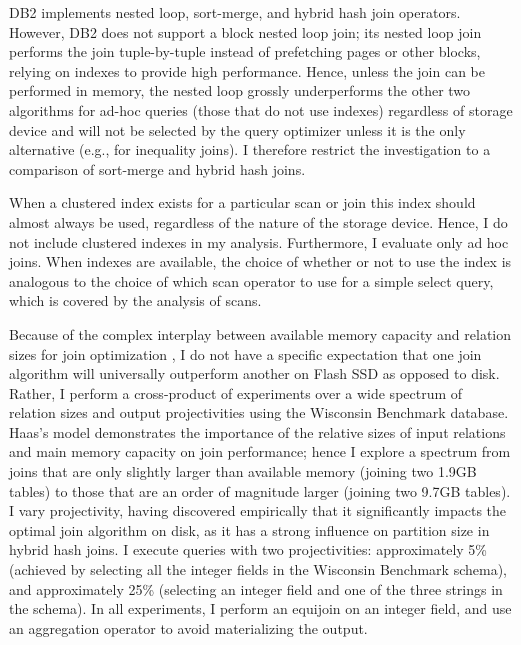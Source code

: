 DB2 implements nested loop, sort-merge, and hybrid hash join operators.  
However, DB2 does not support a block nested loop join; its nested loop join performs the join tuple-by-tuple instead of prefetching pages or other blocks, relying on indexes to provide high performance.
Hence, unless the join can be performed in memory, the nested loop grossly underperforms the other two algorithms for ad-hoc queries (those that do not use indexes) regardless of storage device and will not be selected by the query optimizer unless it is the only alternative (e.g., for inequality joins). 
I therefore restrict the investigation to a comparison of sort-merge and hybrid hash joins.

When a clustered index exists for a particular scan or join this index should almost always be used, regardless of the nature of the storage device.  
Hence, I do not include clustered indexes in my analysis.
Furthermore, I evaluate only ad hoc joins.
When indexes are available, the choice of whether or not to use the index is analogous to the choice of which scan operator to use for a simple select query, which is covered by the analysis of scans.

Because of the complex interplay between available memory capacity and relation sizes for join optimization \cite{DBLP:journals/vldb/HaasCLS97}, I do not have a specific expectation that one join algorithm will universally outperform another on Flash SSD as opposed to disk.
Rather, I perform a cross-product of experiments over a wide spectrum of relation sizes and output projectivities using the Wisconsin Benchmark database.  
Haas's model demonstrates the importance of the relative sizes of input relations and main memory capacity on join performance; hence I explore a spectrum from joins that are only slightly larger than available memory (joining two 1.9GB tables) to those that are an order of magnitude larger (joining two 9.7GB tables).   
I vary projectivity, having discovered empirically that it significantly impacts the optimal join algorithm on disk, as it has a strong influence on partition size in hybrid hash joins.
I execute queries with two projectivities: approximately 5\% (achieved by selecting all the integer fields in the Wisconsin Benchmark schema), and approximately 25\% (selecting an integer field and one of the three strings in the schema).
In all experiments, I perform an equijoin on an integer field, and use an aggregation operator to avoid materializing the output.



